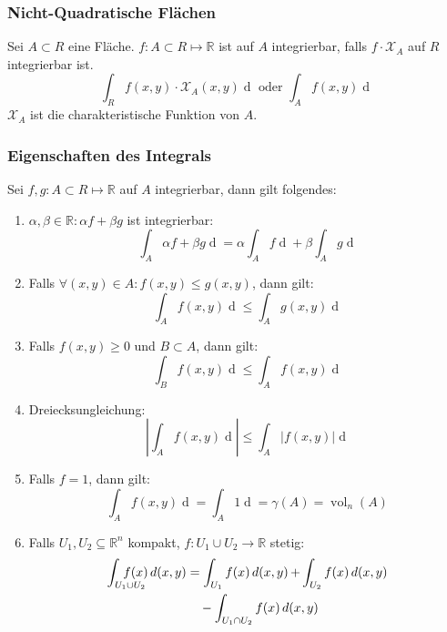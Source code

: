\documentclass[a4paper,10pt]{article}
\def\R{\mathbb{R}}
\def\X{\mathcal{X}}
\begin{document}
\subsubsection*{Nicht-Quadratische Flächen}
Sei $A \subset R$ eine Fläche. $f : A \subset R \mapsto \R$ ist auf $A$ integrierbar, falls $f \cdot \X_A$ auf $R$ integrierbar ist. 
$$\int_R f(x,y) \cdot \X_A(x,y) \mathop{d(x,y)} \text{ oder } \int_A f(x,y) \mathop{d(x,y)}$$
$\X_A$ ist die charakteristische Funktion von $A$.

\subsubsection*{Eigenschaften des Integrals}
Sei $f,g : A \subset R \mapsto \R$ auf $A$ integrierbar, dann gilt folgendes:
\begin{enumerate}
    \item $\alpha, \beta \in \R: \alpha f + \beta g$ ist integrierbar:
            $$\int_A \alpha f + \beta g \mathop{d(x,y)} = \alpha \int_A f \mathop{d(x,y)} + \beta \int_A g \mathop{d(x,y)}$$
    \item Falls $\forall (x,y) \in A: f(x,y) \le g(x,y)$, dann gilt:
            $$\int_A f(x,y) \mathop{d(x,y)} \le \int_A g(x,y) \mathop{d(x,y)}$$
    \item Falls $f(x,y) \ge 0$ und $B \subset A$, dann gilt:
            $$\int_B f(x,y) \mathop{d(x,y)} \le \int_A f(x,y) \mathop{d(x,y)}$$
    \item Dreiecksungleichung:
            $$\left| \int_A f(x,y) \mathop{d(x,y)}\right| \le \int_A \left|f(x,y)\right| \mathop{d(x,y)}$$
    \item Falls $f = 1$, dann gilt:
            $$\int_A f(x,y) \mathop{d(x,y)} = \int_A 1 \mathop{d(x,y)} = \gamma(A)= \operatorname{vol}_n(A)$$
    \item Falls $U_1, U_2 \subseteq \mathbb{R}^n$ kompakt, $f: U_1 \cup U_2 \rightarrow \mathbb{R}$ stetig:
    		\begin{align*}
    			\int_{\mathclap{\qquad \enskip U_{1}\cup U_{2}}} \enskip f(x) \mathop{d(x,y)}&=\int_{U_{1}} f(x) \mathop{d(x,y)}+\int_{U_{2}} f(x) \mathop{d(x,y)}\\
    			&\quad -\int_{U_{1}\cap U_{2}} f(x) \mathop{d(x,y)}
    		\end{align*}
\end{enumerate}
\end{document}
